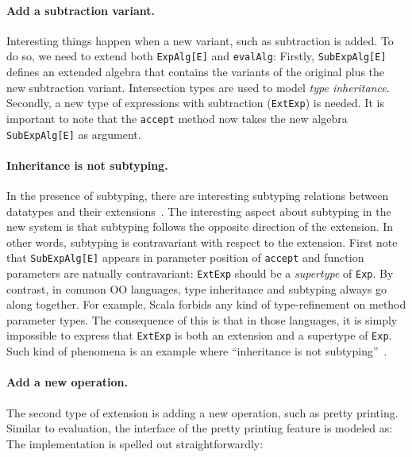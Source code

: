 \paragraph{Add a subtraction variant.} Interesting things happen when a new
variant, such as subtraction is added. To do so, we need to extend both
\lstinline{ExpAlg[E]} and \lstinline{evalAlg}:
Firstly, \lstinline{SubExpAlg[E]} defines an extended algebra that contains the
variants of the original plus the new subtraction variant. Intersection types
are used to model \textit{type inheritance}. Secondly, a new type of expressions
with subtraction (\lstinline{ExtExp}) is needed. It is important to note that
the \lstinline{accept} method now takes the new algebra \lstinline{SubExpAlg[E]} as
argument.

\paragraph{Inheritance is not subtyping.} In the presence of subtyping, there
are interesting subtyping relations between datatypes and their
extensions~\cite{oliveira09modular}. The interesting aspect about subtyping in
the new system is that subtyping follows the opposite direction of the
extension. In other words, subtyping is contravariant with respect to the
extension. First note that \lstinline{SubExpAlg[E]} appears in parameter
position of \lstinline{accept} and function parameters are natually
contravariant: \lstinline{ExtExp} should be a \textit{supertype} of
\lstinline{Exp}. By contrast, in common OO languages, type inheritance and
subtyping always go along together. For example, Scala forbids any kind of
type-refinement on method parameter types. The consequence of this is that in
those languages, it is simply impossible to express that \lstinline{ExtExp} is
both an extension and a supertype of \lstinline{Exp}. Such kind of phenomena is
an example where ``inheritance is not subtyping''~\cite{cook1989inheritance}.

\paragraph{Add a new operation.} The second type of extension is adding a new
operation, such as pretty printing. Similar to evaluation, the interface of the
pretty printing feature is modeled as:
The implementation is spelled out straightforwardly:


